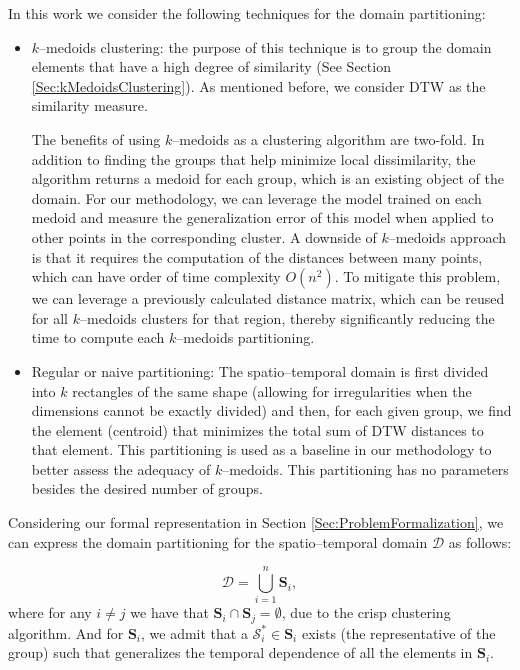 In this work we consider the following techniques for the domain partitioning:

\begin{itemize}%
	\item $k$--medoids clustering: the purpose of this technique is to group the domain elements that have a high degree of similarity (See Section \ref{Sec:kMedoidsClustering}). As mentioned before, we consider DTW as the similarity measure. 
	
	The benefits of using $k$--medoids as a clustering algorithm are two-fold. In addition to finding the groups that help minimize local dissimilarity, the algorithm returns a medoid for each group, which is an existing object of the domain. For our methodology, we can leverage the model trained on each medoid and measure the generalization error of this model when applied to other points in the corresponding cluster. A downside of $k$--medoids approach is that it requires the computation of the distances between many points, which can have order of time complexity $O(n^2)$. To mitigate this problem, we can leverage a previously calculated distance matrix, which can be reused for all $k$--medoids clusters for that region, thereby significantly reducing the time to compute each $k$--medoids partitioning.
	
	\item Regular or naive partitioning: The spatio--temporal domain is first divided into $k$ rectangles of the same shape (allowing for irregularities when the dimensions cannot be exactly divided) and then, for each given group, we find the element (centroid) that minimizes the total sum of DTW distances to that element. This partitioning is used as a baseline in our methodology to better assess the adequacy of $k$--medoids. This partitioning has no parameters besides the desired number of groups.
\end{itemize}

Considering our formal representation in Section \ref{Sec:ProblemFormalization}, we can express the domain partitioning for the spatio--temporal domain $\mathcal{D}$ as follows:

\begin{equation}
\mathcal{D} = \bigcup_{i=1}^{n} \mathbf{S}_{i},
\end{equation}
where for any $i\neq j$ we have that $\mathbf{S}_{i} \cap \mathbf{S}_{j} = \emptyset$, due to the crisp clustering algorithm. And for $\mathbf{S}_{i}$, we admit that a $\mathcal{S}_{i}^{*} \in \mathbf{S}_{i}$ exists (the representative of the group) such that generalizes the temporal dependence of all the elements in $\mathbf{S}_{i}$.

